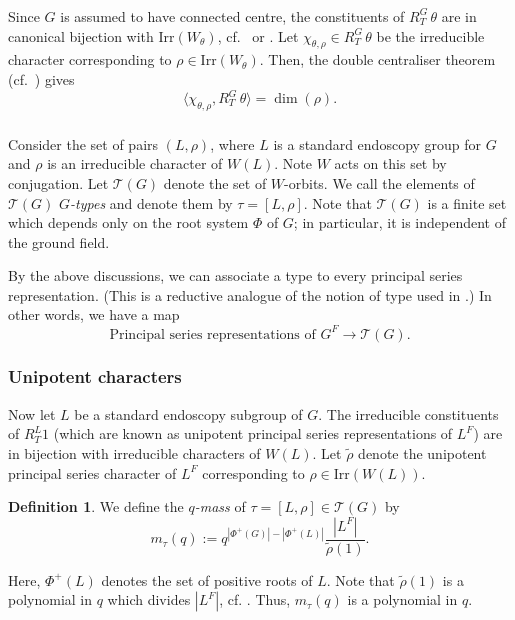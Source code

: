 \documentclass[12pt]{amsart}
\theoremstyle{plain}
\theoremstyle{definition}
\newtheorem{defe}[thm]{Definition}
\theoremstyle{remark}
\newcommand{\ra}{\rightarrow}
\newcommand{\cT}{\mathcal{T}}
\newcommand{\Irr}{\mathrm{Irr}}
\begin{document}
\subsubsection{} \label{s:rep} Since $G$ is assumed to have connected centre, the constituents of $R_T^G \, \theta$ are in canonical bijection with $\Irr(W_\theta)$,  cf.\ \cite[Corollary 4.20]{Kilmoyer78} or \cite[Theorem 6.8]{DL76}.  Let $\chi_{\theta, \rho} \in R_T^G\, \theta$ be the irreducible character corresponding to $\rho\in \Irr(W_\theta)$. Then, the double centraliser theorem (cf.\ \cite[Theorem 5.18.1]{Etingof11}) gives
\[
\langle \chi_{\theta, \rho}, R_T^G\, \theta\rangle = \dim(\rho).
\]

\subsubsection{} Consider the set of pairs $(L, \rho)$, where $L$ is a standard endoscopy group for $G$ and $\rho$ is an irreducible character of $W(L)$. Note $W$ acts on this set by conjugation. Let $\cT(G)$ denote the set of $W$-orbits. We call the elements of $\cT(G)$ \emph{$G$-types} and denote them by $\tau=[L,\rho]$. Note that $\cT(G)$ is a finite set which depends only on the root system $\Phi$ of $G$; in particular, it is independent of the ground field. 


By the above discussions, we can associate a type to every principal series representation. (This is a reductive analogue of the notion of type used in \cite{HRV08, HLRV11, Cambo17}.) In other words, we have a map 
\begin{equation} \label{eq:typeMap}
\textrm{Principal series representations of $G^F$} \ra \cT(G). 
\end{equation} 

\subsubsection{Unipotent characters} Now let $L$ be a standard endoscopy subgroup of $G$. The irreducible constituents of $R_T^L 1$ (which are known as unipotent principal series representations of $L^F$) are in bijection with irreducible characters of $W(L)$. Let $\tilde{\rho}$ denote the unipotent principal series character of $L^F$ corresponding to $\rho\in \Irr(W(L))$. 

 \begin{defe} We define the \emph{$q$-mass} of $\tau=[L,\rho]\in \cT(G)$ by 
 \[
 m_\tau(q):= q^{|\Phi^+(G)| - |\Phi^+(L)|} \frac{|L^F|}{\tilde{\rho}(1)}.
 \]
 \end{defe} 
 Here, $\Phi^+(L)$ denotes the set of positive roots of $L$. 
 Note that $\tilde{\rho}(1)$ is a polynomial in $q$ which divides $|L^F|$, cf. \cite[Remark 2.3.27]{GM20}.
Thus, $m_\tau(q)$ is a polynomial in $q$. 
\end{document}
